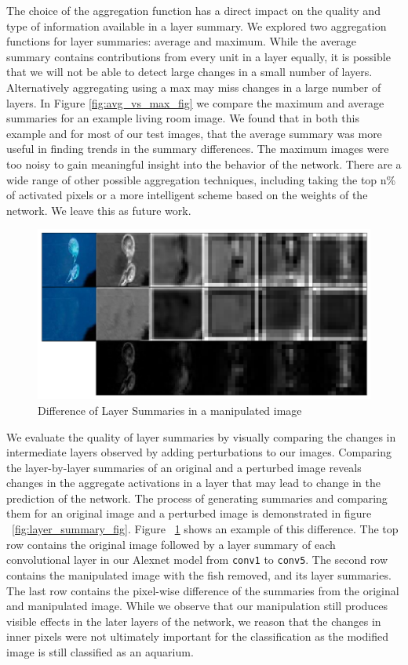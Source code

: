 The choice of the aggregation function has a direct impact on the quality and type of information available in a layer summary. We explored two aggregation functions for layer summaries: average and maximum. While the average summary contains contributions from every unit in a layer equally, it is possible that we will not be able to detect large changes in a small number of layers. Alternatively aggregating using a max may miss changes in a large number of layers. In Figure \ref{fig:avg_vs_max_fig} we compare the maximum and average summaries for an example living room image. We found that in both this example and for most of our test images, that the average summary was more useful in finding trends in the summary differences. The maximum images were too noisy to gain meaningful insight into the behavior of the network. There are a wide range of other possible aggregation techniques, including taking the top n\% of activated pixels or a more intelligent scheme based on the weights of the network. We leave this as future work.

\begin{figure}[tbp]
\centering
\includegraphics[width=\columnwidth]{figures/layer_summary/aquarium_diff_fig}
\caption{Difference of Layer Summaries in a manipulated image}

\label{fig:aquarium_diff_fig}
\end{figure}

We evaluate the quality of layer summaries by visually comparing the changes in intermediate layers observed by adding perturbations to our images. Comparing the layer-by-layer summaries of an original and a perturbed image reveals changes in the aggregate activations in a layer that may lead to change in the prediction of the network. The process of generating summaries and comparing them for an original image and a perturbed image is demonstrated in figure ~\ref{fig:layer_summary_fig}. Figure ~\ref{fig:aquarium_diff_fig} shows an example of this difference. The top row contains the original image followed by a layer summary of each convolutional layer in our Alexnet model from \texttt{conv1}  to \texttt{conv5}. The second row contains the manipulated image with the fish removed, and its layer summaries. The last row contains the pixel-wise difference of the summaries from the original and manipulated image. While we observe that our manipulation still produces visible effects in the later layers of the network, we reason that the changes in inner pixels were not ultimately important for the classification as the modified image is still classified as an aquarium. 

